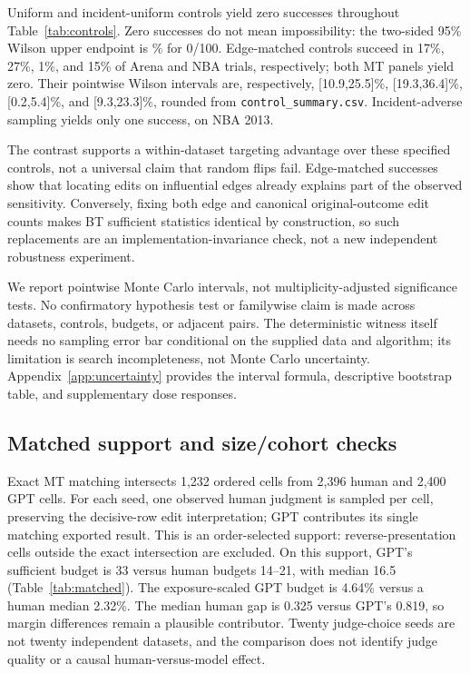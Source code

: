 \documentclass{article}
\begin{document}
Uniform and incident-uniform controls yield zero successes throughout Table~\ref{tab:controls}. Zero successes do not mean impossibility: the two-sided 95\% Wilson upper endpoint is \ZeroUpper\% for 0/100. Edge-matched controls succeed in 17\%, 27\%, 1\%, and 15\% of Arena and NBA trials, respectively; both MT panels yield zero. Their pointwise Wilson intervals are, respectively, [10.9,25.5]\%, [19.3,36.4]\%, [0.2,5.4]\%, and [9.3,23.3]\%, rounded from \texttt{control\_summary.csv}. Incident-adverse sampling yields only one success, on NBA 2013.

The contrast supports a within-dataset targeting advantage over these specified controls, not a universal claim that random flips fail. Edge-matched successes show that locating edits on influential edges already explains part of the observed sensitivity. Conversely, fixing both edge and canonical original-outcome edit counts makes BT sufficient statistics identical by construction, so such replacements are an implementation-invariance check, not a new independent robustness experiment.

We report pointwise Monte Carlo intervals, not multiplicity-adjusted significance tests. No confirmatory hypothesis test or familywise claim is made across datasets, controls, budgets, or adjacent pairs. The deterministic witness itself needs no sampling error bar conditional on the supplied data and algorithm; its limitation is search incompleteness, not Monte Carlo uncertainty. Appendix~\ref{app:uncertainty} provides the interval formula, descriptive bootstrap table, and supplementary dose responses.

\subsection{Matched support and size/cohort checks}
\label{sec:matching}
\begin{table}[t]
\centering
\caption{Descriptive matching checks. MT uses the same 1,232 ordered question/model-pair/turn cells; 20 human runs vary the selected judge row per cell, whereas GPT is evaluated once. Arena uses 20 distinct 2,400-row subsets of a post-selected top-six pool, not MT's model cohort. Min/median/max are observed summaries, not confidence intervals. Generated input: \texttt{paper/tables/matched.tex}.}
\label{tab:matched}
{\small\setlength{\tabcolsep}{4pt}}
\end{table}

Exact MT matching intersects 1,232 ordered cells from 2,396 human and 2,400 GPT cells. For each seed, one observed human judgment is sampled per cell, preserving the decisive-row edit interpretation; GPT contributes its single matching exported result. This is an order-selected support: reverse-presentation cells outside the exact intersection are excluded. On this support, GPT's sufficient budget is 33 versus human budgets 14--21, with median 16.5 (Table~\ref{tab:matched}). The exposure-scaled GPT budget is 4.64\% versus a human median 2.32\%. The median human gap is 0.325 versus GPT's 0.819, so margin differences remain a plausible contributor. Twenty judge-choice seeds are not twenty independent datasets, and the comparison does not identify judge quality or a causal human-versus-model effect.
\end{document}
